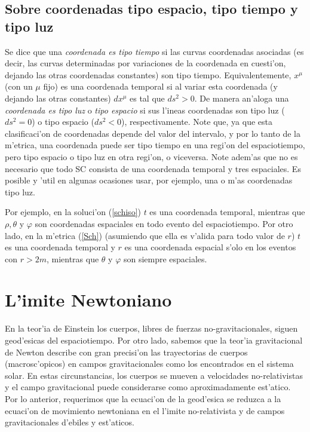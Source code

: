 \subsection{Sobre coordenadas tipo espacio, tipo tiempo y tipo luz}

Se dice que una \textit{coordenada es tipo tiempo} si las curvas coordenadas asociadas (es decir, las curvas determinadas por variaciones de la coordenada en cuesti'on, dejando las otras coordenadas constantes) son tipo tiempo. Equivalentemente, $x^\mu$ (con un $\mu$ fijo) es una coordenada temporal si al variar esta coordenada (y dejando las otras constantes) $dx^\mu$ es tal que $ds^2>0$. De manera an'aloga una \textit{coordenada es tipo luz} o \textit{tipo espacio} si sus l'ineas coordenadas son tipo luz ($ds^2=0$) o tipo espacio ($ds^2<0$), respectivamente. Note que, ya que esta clasificaci'on de coordenadas depende del valor del intervalo, y por lo tanto de la m'etrica, una coordenada puede ser tipo tiempo en una regi'on del espaciotiempo, pero tipo espacio o tipo luz en otra regi'on, o viceversa. Note adem'as que no es necesario que todo SC consista de una coordenada temporal y tres espaciales. Es posible y 'util en algunas ocasiones usar, por ejemplo, una o m'as coordenadas tipo luz.

Por ejemplo, en la soluci'on (\ref{schiso}) $t$ es una coordenada temporal, mientras que $\rho, \theta$ y $\varphi$ son coordenadas espaciales en todo evento del espaciotiempo. Por otro lado, en la m'etrica (\ref{Sch})  (asumiendo que ella es v'alida para todo valor de $r$) $t$ es una coordenada temporal y $r$ es una coordenada espacial s'olo en los eventos con $r>2m$, mientras que $\theta$ y $\varphi$ son siempre espaciales.


\section{L'imite Newtoniano}

En la teor'ia de Einstein los cuerpos, libres de fuerzas no-gravitacionales, siguen geod'esicas del espaciotiempo.
Por otro lado, sabemos que la teor'ia gravitacional de Newton describe con
gran precisi'on las trayectorias de cuerpos (macrosc'opicos) en campos
gravitacionales como los encontrados en el sistema solar. En estas
circunstancias, los cuerpos se mueven a velocidades no-relativistas y el campo gravitacional puede considerarse como aproximadamente est'atico. Por lo
anterior, requerimos que la ecuaci'on de la geod'esica se reduzca a la
ecuaci'on de movimiento newtoniana en el l'imite no-relativista y de campos
gravitacionales d'ebiles y est'aticos.

